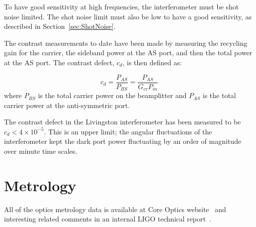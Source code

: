 To have good sensitivity at high frequencies, the interferometer must be
shot noise limited. The shot noise limit must also be low to have a good
sensitivity, as described in Section~\ref{sec:ShotNoise}.

The contrast measurements to date have been made by measuring the
recycling gain for the carrier, the sideband power at the AS port, and then
the total power at the AS port. The contrast defect, $c_d$, is then
defined as:

\begin{equation}
c_d = \frac{P_{AS}}{P_{BS}} = \frac{P_{AS}}{G_{cr} P_{in}}
\end{equation}
where $P_{BS}$ is the total carrier power on the beamplitter and
$P_{AS}$ is the total carrier power at the anti-symmetric port.

The contrast defect in the Livingston interferometer has been measured to be
$c_d < 4 \times 10^{-5}$. This is an upper limit; the angular
fluctuations of the interferometer kept the dark port power fluctuating
by an order of magnitude over minute time scales.


\section{Metrology}

All of the optics metrology data is available at Core Optics 
website~\cite{COCwebsite} and interesting related comments in
an internal LIGO technical report~\cite{Rai:Metrology}.

